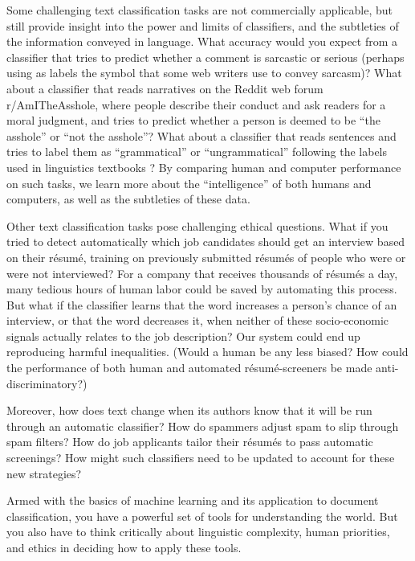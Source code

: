 Some challenging text classification tasks are not commercially applicable, but still provide insight into the power and limits of classifiers, and the subtleties of the information conveyed in language.  What accuracy would you expect from a classifier that tries to predict whether a comment is sarcastic or serious (perhaps using as labels the  symbol that some web writers use to convey sarcasm)? What about a classifier that reads narratives on the Reddit web forum r/AmITheAsshole, where people describe their conduct and ask readers for a moral judgment, and tries to predict whether a person is deemed to be ``the asshole'' or ``not the asshole''?  What about a classifier that reads sentences and tries to label them as ``grammatical'' or ``ungrammatical'' following the labels used in linguistics textbooks \citep{Warstadt-etal:2019}?  By comparing human and computer performance  on such tasks, we learn more about the ``intelligence'' of both humans and computers, as well as the subtleties of these data.

Other text classification tasks pose challenging ethical questions.  What if you tried to  detect automatically which job candidates should get an interview based on their r\'esum\'e, training on previously submitted r\'esum\'es of people who were or were not interviewed?  For a company that receives thousands of   r\'esum\'es a day, many tedious hours of human labor could be saved by automating this process.  But what if the classifier learns that the word  increases a person's chance of an interview, or that the word  decreases it, when neither of these socio-economic signals actually relates to the job description?  Our system could end up reproducing harmful inequalities.  (Would a human be any less biased?  How could the performance of both human and automated r\'esum\'e-screeners be made anti-discriminatory?)

Moreover, how does text change when its authors know that it will be run through an automatic classifier? How do spammers adjust spam to slip through spam filters? How do job applicants tailor their r\'esum\'es to pass automatic screenings?  How might such classifiers need to be updated to account for these new strategies?


Armed with the basics of machine learning and its application to document classification, you have a powerful set of tools for understanding the world.  But you also have to think critically about linguistic complexity, human priorities, and ethics in deciding how to apply these tools.


